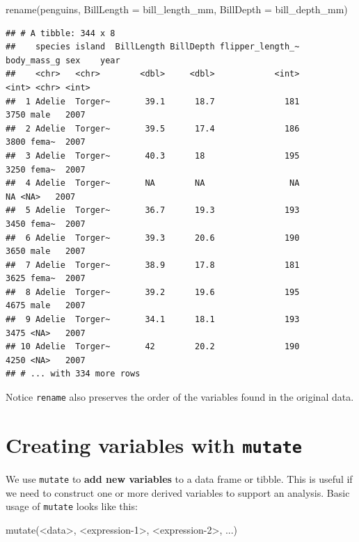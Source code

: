 \documentclass[
]{book}
\newenvironment{Shaded}{\begin{snugshade}}{\end{snugshade}}
\newcommand{\AttributeTok}[1]{\textcolor[rgb]{0.77,0.63,0.00}{#1}}
\newcommand{\DecValTok}[1]{\textcolor[rgb]{0.00,0.00,0.81}{#1}}
\newcommand{\FunctionTok}[1]{\textcolor[rgb]{0.00,0.00,0.00}{#1}}
\newcommand{\NormalTok}[1]{#1}
\newcommand{\SpecialCharTok}[1]{\textcolor[rgb]{0.00,0.00,0.00}{#1}}
\begin{document}
\begin{Shaded}
\begin{Highlighting}[]
\FunctionTok{rename}\NormalTok{(penguins, }\AttributeTok{BillLength =}\NormalTok{ bill\_length\_mm, }\AttributeTok{BillDepth =}\NormalTok{ bill\_depth\_mm)}
\end{Highlighting}
\end{Shaded}

\begin{verbatim}
## # A tibble: 344 x 8
##    species island  BillLength BillDepth flipper_length_~ body_mass_g sex    year
##    <chr>   <chr>        <dbl>     <dbl>            <int>       <int> <chr> <int>
##  1 Adelie  Torger~       39.1      18.7              181        3750 male   2007
##  2 Adelie  Torger~       39.5      17.4              186        3800 fema~  2007
##  3 Adelie  Torger~       40.3      18                195        3250 fema~  2007
##  4 Adelie  Torger~       NA        NA                 NA          NA <NA>   2007
##  5 Adelie  Torger~       36.7      19.3              193        3450 fema~  2007
##  6 Adelie  Torger~       39.3      20.6              190        3650 male   2007
##  7 Adelie  Torger~       38.9      17.8              181        3625 fema~  2007
##  8 Adelie  Torger~       39.2      19.6              195        4675 male   2007
##  9 Adelie  Torger~       34.1      18.1              193        3475 <NA>   2007
## 10 Adelie  Torger~       42        20.2              190        4250 <NA>   2007
## # ... with 334 more rows
\end{verbatim}

Notice \texttt{rename} also preserves the order of the variables found in the original data.

\hypertarget{creating-variables-with-mutate}{%
\section{\texorpdfstring{Creating variables with \texttt{mutate}}{Creating variables with mutate}}\label{creating-variables-with-mutate}}

We use \texttt{mutate} to \textbf{add new variables} to a data frame or tibble. This is useful if we need to construct one or more derived variables to support an analysis. Basic usage of \texttt{mutate} looks like this:

\begin{Shaded}
\begin{Highlighting}[]
\FunctionTok{mutate}\NormalTok{(}\SpecialCharTok{\textless{}}\NormalTok{data}\SpecialCharTok{\textgreater{}}\NormalTok{, }\SpecialCharTok{\textless{}}\NormalTok{expression}\DecValTok{{-}1}\SpecialCharTok{\textgreater{}}\NormalTok{, }\SpecialCharTok{\textless{}}\NormalTok{expression}\DecValTok{{-}2}\SpecialCharTok{\textgreater{}}\NormalTok{, ...)}
\end{Highlighting}
\end{Shaded}
\end{document}
